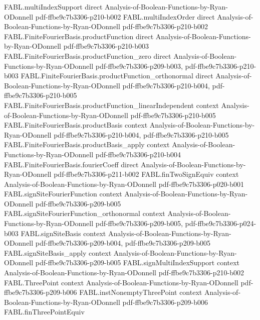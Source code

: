 \begin{theorem}
\proofstep
  {FABL.multiIndexSupport}
  {direct}
  {Analysis-of-Boolean-Functions-by-Ryan-ODonnell}
  {pdf-ffbe9c7b3306-p210-b002}
\proofstep
  {FABL.multiIndexOrder}
  {direct}
  {Analysis-of-Boolean-Functions-by-Ryan-ODonnell}
  {pdf-ffbe9c7b3306-p210-b002}
\proofstep
  {FABL.FiniteFourierBasis.productFunction}
  {direct}
  {Analysis-of-Boolean-Functions-by-Ryan-ODonnell}
  {pdf-ffbe9c7b3306-p210-b003}
\proofstep
  {FABL.FiniteFourierBasis.productFunction_zero}
  {direct}
  {Analysis-of-Boolean-Functions-by-Ryan-ODonnell}
  {pdf-ffbe9c7b3306-p209-b003,
    pdf-ffbe9c7b3306-p210-b003}
\proofstep
  {FABL.FiniteFourierBasis.productFunction_orthonormal}
  {direct}
  {Analysis-of-Boolean-Functions-by-Ryan-ODonnell}
  {pdf-ffbe9c7b3306-p210-b004,
    pdf-ffbe9c7b3306-p210-b005}
\proofstep
  {FABL.FiniteFourierBasis.productFunction_linearIndependent}
  {context}
  {Analysis-of-Boolean-Functions-by-Ryan-ODonnell}
  {pdf-ffbe9c7b3306-p210-b005}
\proofstep
  {FABL.FiniteFourierBasis.productBasis}
  {context}
  {Analysis-of-Boolean-Functions-by-Ryan-ODonnell}
  {pdf-ffbe9c7b3306-p210-b004,
    pdf-ffbe9c7b3306-p210-b005}
\proofstep
  {FABL.FiniteFourierBasis.productBasis_apply}
  {context}
  {Analysis-of-Boolean-Functions-by-Ryan-ODonnell}
  {pdf-ffbe9c7b3306-p210-b004}
\proofstep
  {FABL.FiniteFourierBasis.fourierCoeff}
  {direct}
  {Analysis-of-Boolean-Functions-by-Ryan-ODonnell}
  {pdf-ffbe9c7b3306-p211-b002}
\proofstep
  {FABL.finTwoSignEquiv}
  {context}
  {Analysis-of-Boolean-Functions-by-Ryan-ODonnell}
  {pdf-ffbe9c7b3306-p020-b001}
\proofstep
  {FABL.signSiteFourierFunction}
  {context}
  {Analysis-of-Boolean-Functions-by-Ryan-ODonnell}
  {pdf-ffbe9c7b3306-p209-b005}
\proofstep
  {FABL.signSiteFourierFunction_orthonormal}
  {context}
  {Analysis-of-Boolean-Functions-by-Ryan-ODonnell}
  {pdf-ffbe9c7b3306-p209-b005,
    pdf-ffbe9c7b3306-p024-b003}
\proofstep
  {FABL.signSiteBasis}
  {context}
  {Analysis-of-Boolean-Functions-by-Ryan-ODonnell}
  {pdf-ffbe9c7b3306-p209-b004,
    pdf-ffbe9c7b3306-p209-b005}
\proofstep
  {FABL.signSiteBasis_apply}
  {context}
  {Analysis-of-Boolean-Functions-by-Ryan-ODonnell}
  {pdf-ffbe9c7b3306-p209-b005}
\proofstep
  {FABL.signMultiIndexSupport}
  {context}
  {Analysis-of-Boolean-Functions-by-Ryan-ODonnell}
  {pdf-ffbe9c7b3306-p210-b002}
\proofstep
  {FABL.ThreePoint}
  {context}
  {Analysis-of-Boolean-Functions-by-Ryan-ODonnell}
  {pdf-ffbe9c7b3306-p209-b006}
\proofstep
  {FABL.instNonemptyThreePoint}
  {context}
  {Analysis-of-Boolean-Functions-by-Ryan-ODonnell}
  {pdf-ffbe9c7b3306-p209-b006}
\proofstep
  {FABL.finThreePointEquiv}

\end{theorem}
